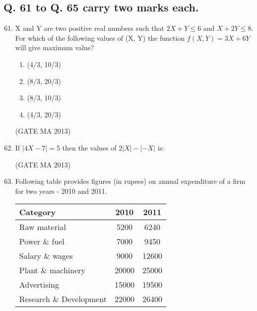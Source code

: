 \documentclass[journal,12pt,onecolumn]{IEEEtran}
\theoremstyle{remark}
\begin{document}
\subsection*{Q. 61 to Q. 65 carry two marks each.}
\begin{enumerate}
    \setcounter{enumi}{60}
    \item X and Y are two positive real numbers such that $2X + Y \le 6$ and $X + 2Y \le 8$. For which of the following values of (X, Y) the function $f(X, Y) = 3X + 6Y$ will give maximum value?
    \begin{enumerate}
        \item (4/3, 10/3)
        \item (8/3, 20/3)
        \item (8/3, 10/3)
        \item (4/3, 20/3)
    \end{enumerate}
    \hfill (GATE MA 2013)
    \item If $|4X - 7| = 5$ then the values of $2|X| - |-X|$ is:
    \begin{enumerate}
    \end{enumerate}
    \hfill (GATE MA 2013)
    \item Following table provides figures (in rupees) on annual expenditure of a firm for two years - 2010 and 2011.
    \begin{center}
        \begin{tabular}{|l|c|c|}
            \hline
            \textbf{Category} & \textbf{2010} & \textbf{2011} \\
            \hline
            Raw material & 5200 & 6240 \\
            Power \& fuel & 7000 & 9450 \\
            Salary \& wages & 9000 & 12600 \\
            Plant \& machinery & 20000 & 25000 \\
            Advertising & 15000 & 19500 \\
            Research \& Development & 22000 & 26400 \\
            \hline
        \end{tabular}

\end{center}
\end{enumerate}
\end{document}
